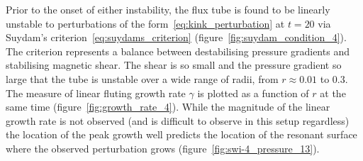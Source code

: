 Prior to the onset of either instability, the flux tube is found to be linearly unstable to perturbations of the form~\ref{eq:kink_perturbation} at $t=20$ via Suydam's criterion~\ref{eq:suydams_criterion} (figure~\ref{fig:suydam_condition_4}). The criterion represents a balance between destabilising pressure gradients and stabilising magnetic shear. The shear is so small and the pressure gradient so large that the tube is unstable over a wide range of radii, from $r\approx 0.01$ to $0.3$. The measure of linear fluting growth rate $\gamma$ is plotted as a function of $r$ at the same time (figure~\ref{fig:growth_rate_4}). While the magnitude of the linear growth rate is not observed (and is difficult to observe in this setup regardless) the location of the peak growth well predicts the location of the resonant surface where the observed perturbation grows (figure~\ref{fig:swi-4_pressure_13}).

